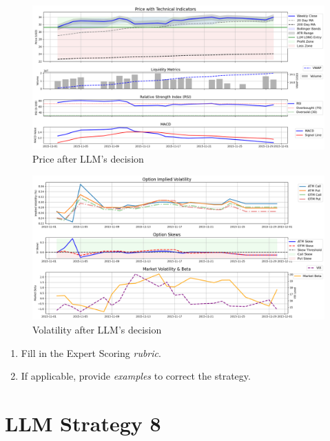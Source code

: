 \documentclass[8pt]{scrartcl}
\begin{document}
\begin{figure}[H]
    \centering
    \includegraphics[width=1\linewidth]{judge_reviews/AMZN_M_gpt-4o-mini//2015-11-01/llm_Price_with_Technical_Indicators.png}
    \caption{Price after LLM's decision}
\end{figure}

\begin{figure}[H]
    \centering
    \includegraphics[width=1\linewidth]{judge_reviews/AMZN_M_gpt-4o-mini/2015-11-01/llm_Market_Volatility_&_Beta.png}
    \caption{Volatility after LLM's decision}
\end{figure}

\begin{tcolorbox}[colback=blue!10, colframe=blue!60, title=\textbf{TASKS}, sharp corners=southwest]
\begin{enumerate}
    \item Fill in the Expert Scoring \textit{rubric}.
    \item If applicable, provide \textit{examples} to correct the strategy.
\end{enumerate}
\end{tcolorbox}
\newpage



\section*{LLM Strategy 8}
\label{app:s8}
\end{document}
